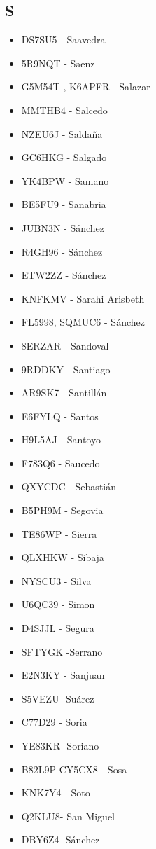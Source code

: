 \subsection*{S}
\begin{itemize}[leftmargin=*,nosep]
\item DS7SU5  -  Saavedra
\item 5R9NQT - Saenz
\item G5M54T , K6APFR -  Salazar
\item MMTHB4  -  Salcedo
\item NZEU6J  -  Saldaña
\item GC6HKG  -  Salgado
\item YK4BPW - Samano
\item BE5FU9 - Sanabria
\item JUBN3N - Sánchez
\item R4GH96 - Sánchez
\item ETW2ZZ  -  Sánchez
\item KNFKMV - Sarahi Arisbeth
\item FL5998, SQMUC6 -  Sánchez
\item 8ERZAR - Sandoval
\item 9RDDKY  -  Santiago
\item AR9SK7 - Santillán
\item E6FYLQ  -  Santos
\item H9L5AJ - Santoyo
\item F783Q6 - Saucedo
\item QXYCDC - Sebastián
\item B5PH9M - Segovia
\item TE86WP  -  Sierra
\item QLXHKW - Sibaja
\item NYSCU3 - Silva
\item U6QC39 -  Simon
\item D4SJJL - Segura
\item SFTYGK -Serrano
\item E2N3KY - Sanjuan
\item S5VEZU- Suárez
\item C77D29 - Soria
\item YE83KR- Soriano
\item B82L9P CY5CX8 - Sosa
\item KNK7Y4 - Soto
\item Q2KLU8- San Miguel
\item DBY6Z4- Sánchez
\end{itemize}

